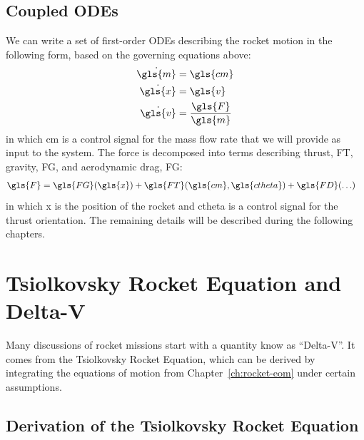 \documentclass[12pt,openany]{book}
\begin{document}
\section{Coupled ODEs}

We can write a set of first-order ODEs describing the rocket motion in the following form, based on the governing equations above:
\begin{align}
  \dot{\gls{m}} &= \gls{cm} \\
  \dot{\gls{x}} &= \gls{v} \\
  \dot{\gls{v}} &= \frac{\gls{F}}{\gls{m}} \label{eq:accel}
\end{align}
in which \gls{cm} is a control signal for the mass flow rate that we will provide as input to the system. The force is decomposed into terms describing thrust, \gls{FT}, gravity, \gls{FG}, and aerodynamic drag, \gls{FG}:
\begin{align}
  \gls{F} &= \gls{FG}(\gls{x})
  + \gls{FT}(\gls{cm},\gls{ctheta})
  + \gls{FD}(\ldots) 
\end{align}
in which \gls{x} is the position of the rocket and \gls{ctheta} is a control signal for the thrust orientation. The remaining details will be described during the following chapters.

\chapter{Tsiolkovsky Rocket Equation and Delta-V}

Many discussions of rocket missions start with a quantity know as ``Delta-V''. It comes from the Tsiolkovsky Rocket Equation, which can be derived by integrating the equations of motion from Chapter~\ref{ch:rocket-eom} under certain assumptions.

\section{Derivation of the Tsiolkovsky Rocket Equation}
\end{document}
